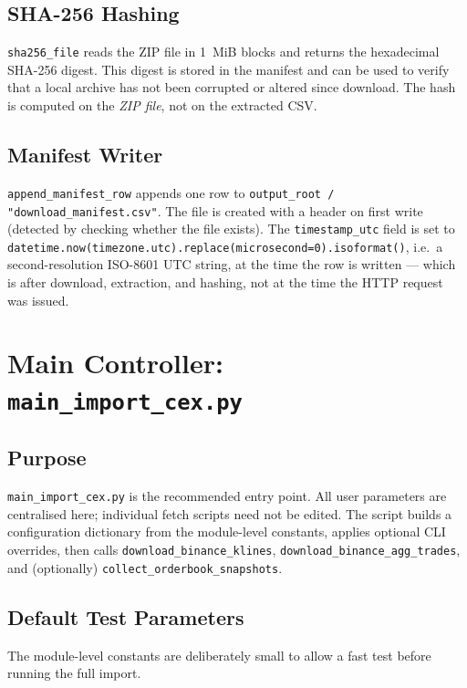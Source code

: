 \documentclass[11pt,a4paper]{article}
\begin{document}
\subsection{SHA-256 Hashing}

\texttt{sha256\_file} reads the ZIP file in 1~MiB blocks and
returns the hexadecimal SHA-256 digest. This digest is stored in the
manifest and can be used to verify that a local archive has not been
corrupted or altered since download. The hash is computed on the
\emph{ZIP file}, not on the extracted CSV.

\subsection{Manifest Writer}

\texttt{append\_manifest\_row} appends one row to
\texttt{output\_root / "download\_manifest.csv"}. The file is created
with a header on first write (detected by checking whether the file
exists). The \texttt{timestamp\_utc} field is set to
\texttt{datetime.now(timezone.utc).replace(microsecond=0).isoformat()},
i.e.\ a second-resolution ISO-8601 UTC string, at the time the row is
written --- which is after download, extraction, and hashing, not at
the time the HTTP request was issued.

\section{Main Controller: \texttt{main\_import\_cex.py}}
\label{sec:main}

\subsection{Purpose}

\texttt{main\_import\_cex.py} is the recommended entry point. All
user parameters are centralised here; individual fetch scripts need
not be edited. The script builds a configuration dictionary from the
module-level constants, applies optional CLI overrides, then calls
\texttt{download\_binance\_klines}, \texttt{download\_binance\_agg\_trades},
and (optionally) \texttt{collect\_orderbook\_snapshots}.

\subsection{Default Test Parameters}

The module-level constants are deliberately small to allow a fast
test before running the full import.
\end{document}
